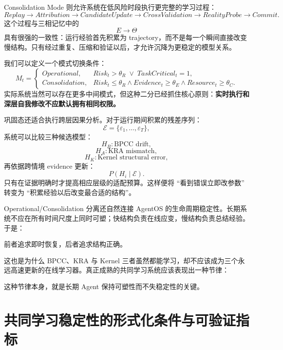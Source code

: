 Consolidation Mode 则允许系统在低风险时段执行更完整的学习过程：
\[
Replay
\rightarrow
Attribution
\rightarrow
CandidateUpdate
\rightarrow
CrossValidation
\rightarrow
RealityProbe
\rightarrow
Commit.
\]
这个过程与三相记忆中的
\[
E\rightarrow\Theta
\]
具有很强的一致性：运行经验首先积累为 trajectory，而不是每一个瞬间直接改变慢结构。只有经过重复、压缩和验证以后，才允许沉降为更稳定的模型关系。

我们可以定义一个模式切换条件：
\[
M_t
=
\begin{cases}
Operational,
&
Risk_t>\theta_R
\;\lor\;
TaskCritical_t=1,
\\[4pt]
Consolidation,
&
Risk_t\leq\theta_R
\land
Evidence_t\geq\theta_E
\land
Resource_t\geq\theta_C.
\end{cases}
\]
实际系统当然可以存在更多中间模式，但这种二分已经抓住核心原则：\textbf{实时执行和深层自我修改不应默认拥有相同权限。}

巩固态还适合执行跨层因果分析。对于运行期间积累的残差序列：
\[
\mathcal E
=
\{\varepsilon_1,\ldots,\varepsilon_T\},
\]
系统可以比较三种候选模型：
\[
H_B:
\text{BPCC drift},
\]
\[
H_A:
\text{KRA mismatch},
\]
\[
H_K:
\text{Kernel structural error},
\]
再依据跨情境 evidence 更新：
\[
P(H_i\mid\mathcal E).
\]
只有在证据明确时才提高相应层级的适配预算。这样便将 ``看到错误立即改参数'' 转变为 ``积累经验以后改变最合适的结构''。

Operational/Consolidation 分离还自然连接 AgentOS 的生命周期稳定性。长期系统不应在所有时间尺度上同时可塑；快结构负责在线应变，慢结构负责总结经验。于是：
\begin{statementbox}
\centering
{}
\end{statementbox}
前者追求即时恢复，后者追求结构正确。

这也是为什么 BPCC、KRA 与 Kernel 三者虽然都能学习，却不应该成为三个永远高速更新的在线学习器。真正成熟的共同学习系统应该表现出一种节律：
\begin{statementbox}
\centering
{}
\end{statementbox}
这种节律本身，就是长期 Agent 保持可塑性而不失稳定性的关键。

\section{共同学习稳定性的形式化条件与可验证指标}

